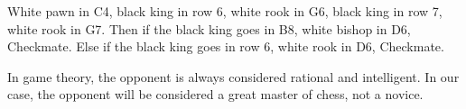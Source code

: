 White pawn in C4, black king in row 6, white rook in G6, black king in row 7, white rook in G7. Then if the black king goes in B8, white bishop in D6, Checkmate. Else if the black king goes in row 6, white rook in D6, Checkmate.

In game theory, the opponent is always considered rational and intelligent. In our case, the opponent will be considered a great master of chess, not a novice.
